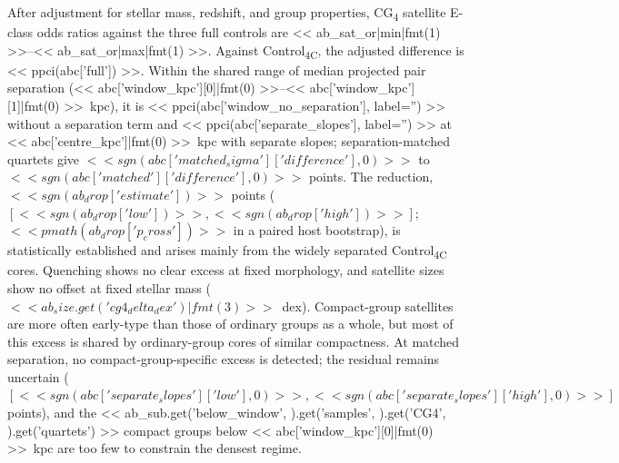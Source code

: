 \documentclass{aa}
\newcommand{\CC}{Control\textsubscript{4C}}
\newcommand{\CG}{CG\textsubscript{4}}
\begin{document}
  {After adjustment for stellar mass, redshift, and group properties, \CG{} satellite E-class odds ratios against the three full controls are << ab_sat_or|min|fmt(1) >>--<< ab_sat_or|max|fmt(1) >>. Against \CC{}, the adjusted difference is << ppci(abc['full']) >>. Within the shared range of median projected pair separation (<< abc['window_kpc'][0]|fmt(0) >>--<< abc['window_kpc'][1]|fmt(0) >>~kpc), it is << ppci(abc['window_no_separation'], label='') >> without a separation term and << ppci(abc['separate_slopes'], label='') >> at << abc['centre_kpc']|fmt(0) >>~kpc with separate slopes; separation-matched quartets give \(<< sgn(abc['matched_sigma']['difference'], 0) >>\) to \(<< sgn(abc['matched']['difference'], 0) >>\) points. The reduction, \(<< sgn(ab_drop['estimate']) >>\) points (\([<< sgn(ab_drop['low']) >>, << sgn(ab_drop['high']) >>]\); \(<< pmath(ab_drop['p_cross']) >>\) in a paired host bootstrap), is statistically established and arises mainly from the widely separated \CC{} cores. Quenching shows no clear excess at fixed morphology, and satellite sizes show no offset at fixed stellar mass (\(<< ab_size.get('cg4_delta_dex')|fmt(3) >>\)~dex).}
  {Compact-group satellites are more often early-type than those of ordinary groups as a whole, but most of this excess is shared by ordinary-group cores of similar compactness. At matched separation, no compact-group-specific excess is detected; the residual remains uncertain (\([<< sgn(abc['separate_slopes']['low'], 0) >>, << sgn(abc['separate_slopes']['high'], 0) >>]\) points), and the << ab_sub.get('below_window', {}).get('samples', {}).get('CG4', {}).get('quartets') >> compact groups below << abc['window_kpc'][0]|fmt(0) >>~kpc are too few to constrain the densest regime.}


   \maketitle
\end{document}
